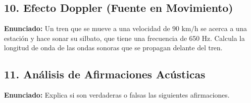 \documentclass[12pt, letterpaper]{article}
\begin{document}
\subsection*{10. Efecto Doppler (Fuente en Movimiento)}
\noindent \textbf{Enunciado:} Un tren que se mueve a una velocidad de $90 \text{ km/h}$ se acerca a una estación y hace sonar su silbato, que tiene una frecuencia de 650 Hz. Calcula la longitud de onda de las ondas sonoras que se propagan delante del tren.


\subsection*{11. Análisis de Afirmaciones Acústicas}
\noindent \textbf{Enunciado:} Explica si son verdaderas o falsas las siguientes afirmaciones.
\end{document}
